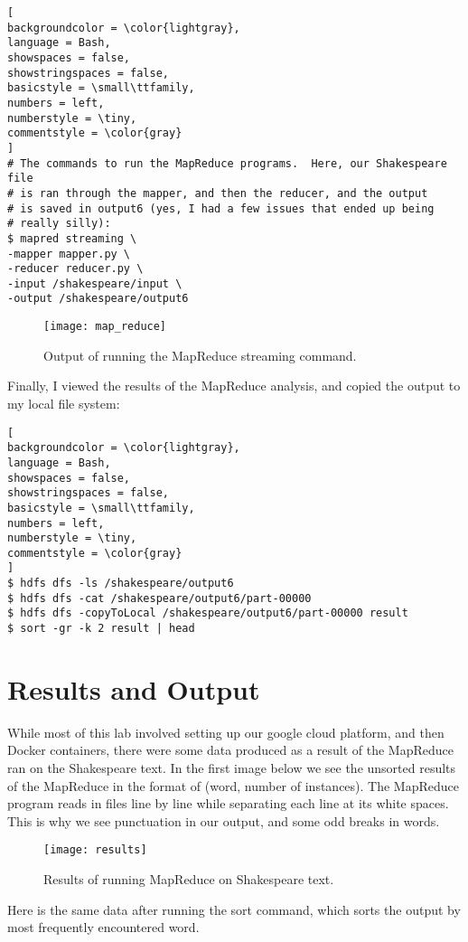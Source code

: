 \documentclass[]{article}
\begin{document}
\begin{lstlisting}[
backgroundcolor = \color{lightgray},
language = Bash,
showspaces = false,
showstringspaces = false,
basicstyle = \small\ttfamily,
numbers = left,
numberstyle = \tiny,
commentstyle = \color{gray}
]
# The commands to run the MapReduce programs.  Here, our Shakespeare file 
# is ran through the mapper, and then the reducer, and the output 
# is saved in output6 (yes, I had a few issues that ended up being 
# really silly):
$ mapred streaming \
-mapper mapper.py \
-reducer reducer.py \
-input /shakespeare/input \
-output /shakespeare/output6
\end{lstlisting}
\begin{figure}[!h]
	\texttt{[image: map\_reduce]}
	\caption{Output of running the MapReduce streaming command.}
	\label{Fig:Race}
\end{figure}
Finally, I viewed the results of the MapReduce analysis, and copied the output to my local file system:

\begin{lstlisting}[
backgroundcolor = \color{lightgray},
language = Bash,
showspaces = false,
showstringspaces = false,
basicstyle = \small\ttfamily,
numbers = left,
numberstyle = \tiny,
commentstyle = \color{gray}
]
$ hdfs dfs -ls /shakespeare/output6
$ hdfs dfs -cat /shakespeare/output6/part-00000
$ hdfs dfs -copyToLocal /shakespeare/output6/part-00000 result
$ sort -gr -k 2 result | head
\end{lstlisting}
\section{Results and Output}
While most of this lab involved setting up our google cloud platform, and then Docker containers, there were some data produced as a result of the MapReduce ran on the Shakespeare text.  In the first image below we see the unsorted results of the MapReduce in the format of (word, number of instances).  The MapReduce program reads in files line by line while separating each line at its white spaces.  This is why we see punctuation in our output, and some odd breaks in words.

\begin{figure}[!h]
	\texttt{[image: results]}
	\caption{Results of running MapReduce on Shakespeare text.}
	\label{Fig:Race}
\end{figure}

Here is the same data after running the sort command, which sorts the output by most frequently encountered word.
\end{document}

